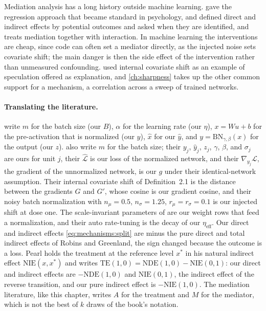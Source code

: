 \begin{refsection}
Mediation analysis has a long history outside machine learning. \Textcite{BaronKenny1986} gave the regression approach that became standard in psychology, \textcite{RobinsGreenland1992} and \textcite{Pearl2001} defined direct and indirect effects by potential outcomes and asked when they are identified, and \textcite{VanderWeele2015} treats mediation together with interaction. In machine learning the interventions are cheap, since code can often set a mediator directly, as the injected noise sets covariate shift; the main danger is then the side effect of the intervention rather than unmeasured confounding. \Textcite{LiptonSteinhardt2019} used internal covariate shift as an example of speculation offered as explanation, and \cref{ch:sharpness} takes up the other common support for a mechanism, a correlation across a sweep of trained networks.

\paragraph{Translating the literature.} \Textcite{IoffeSzegedy2015} write $m$ for the batch size (our $B$), $\alpha$ for the learning rate (our $\eta$), $x=Wu+b$ for the pre-activation that is normalized (our $y$), $\hat x$ for our $\hat y$, and $y=\mathrm{BN}_{\gamma,\beta}(x)$ for the output (our $z$). \Textcite{SanturkarEtAl2018} also write $m$ for the batch size; their $y_j$, $\hat y_j$, $z_j$, $\gamma$, $\beta$, and $\sigma_j$ are ours for unit $j$, their $\widehat{\mathcal L}$ is our loss of the normalized network, and their $\nabla_{y_j}\mathcal L$, the gradient of the unnormalized network, is our $g$ under their identical-network assumption. Their internal covariate shift of Definition~2.1 is the distance between the gradients $G$ and $G'$, whose cosine is our gradient cosine, and their noisy batch normalization with $n_\mu=0.5$, $n_\sigma=1.25$, $r_\mu=r_\sigma=0.1$ is our injected shift at dose one. The scale-invariant parameters of \textcite{AroraLiLyu2019} are our weight rows that feed a normalization, and their auto rate-tuning is the decay of our $\eta_{\mathrm{eff}}$. Our direct and indirect effects \eqref{eq:mechanisms:split} are minus the pure direct and total indirect effects of Robins and Greenland, the sign changed because the outcome is a loss. Pearl holds the treatment at the reference level $x^*$ in his natural indirect effect $\mathrm{NIE}(x,x^*)$ and writes $\mathrm{TE}(1,0)=\mathrm{NDE}(1,0)-\mathrm{NIE}(0,1)$: our direct and indirect effects are $-\mathrm{NDE}(1,0)$ and $\mathrm{NIE}(0,1)$, the indirect effect of the reverse transition, and our pure indirect effect is $-\mathrm{NIE}(1,0)$. The mediation literature, like this chapter, writes $A$ for the treatment and $M$ for the mediator, which is not the best of $k$ draws of the book's notation.

\printchapterbib
\end{refsection}
